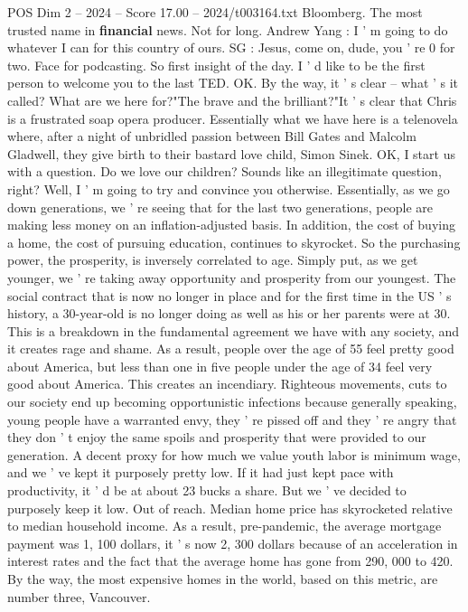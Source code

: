 \begin{textsample}{POS Dim 2 – 2024 – Score 17.00 – 2024/t003164.txt}
Bloomberg.
The most trusted name in \textbf{financial} news.
Not for long.
Andrew Yang : I ' m going to do whatever I can for this country of ours.
SG : Jesus, come on, dude, you ' re 0 for two.
Face for podcasting.
So first insight of the day.
I ' d like to be the first person to welcome you to the last TED.
OK.
By the way, it ' s clear -- what ' s it called?
What are we here for?"The brave and the brilliant?"It ' s clear that Chris is a frustrated soap opera producer.
Essentially what we have here is a telenovela where, after a night of unbridled passion between Bill Gates and Malcolm Gladwell, they give birth to their bastard love child, Simon Sinek.
OK, I start us with a question.
Do we love our children?
Sounds like an illegitimate question, right?
Well, I ' m going to try and convince you otherwise.
Essentially, as we go down generations, we ' re seeing that for the last two generations, people are making less money on an inflation-adjusted basis.
In addition, the cost of buying a home, the cost of pursuing education, continues to skyrocket.
So the purchasing power, the prosperity, is inversely correlated to age.
Simply put, as we get younger, we ' re taking away opportunity and prosperity from our youngest.
The social contract that is now no longer in place and for the first time in the US ' s history, a 30-year-old is no longer doing as well as his or her parents were at 30.
This is a breakdown in the fundamental agreement we have with any society, and it creates rage and shame.
As a result, people over the age of 55 feel pretty good about America, but less than one in five people under the age of 34 feel very good about America.
This creates an incendiary.
Righteous movements, cuts to our society end up becoming opportunistic infections because generally speaking, young people have a warranted envy, they ' re pissed off and they ' re angry that they don ' t enjoy the same spoils and prosperity that were provided to our generation.
A decent proxy for how much we value youth labor is minimum wage, and we ' ve kept it purposely pretty low.
If it had just kept pace with productivity, it ' d be at about 23 bucks a share.
But we ' ve decided to purposely keep it low.
Out of reach.
Median home price has skyrocketed relative to median household income.
As a result, pre-pandemic, the average mortgage payment was 1, 100 dollars, it ' s now 2, 300 dollars because of an acceleration in interest rates and the fact that the average home has gone from 290, 000 to 420.
By the way, the most expensive homes in the world, based on this metric, are number three, Vancouver.

\end{textsample}
